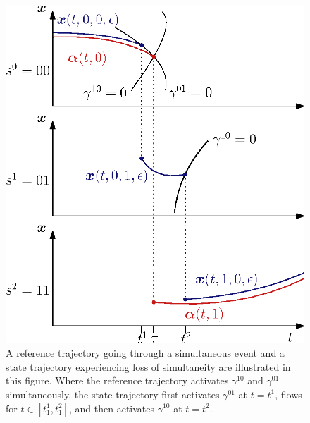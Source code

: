 \documentclass[../DC2017114Bouma.tex]{subfiles}
\begin{document}
\begin{figure}[h]
\centering
\includegraphics[width=.52\textwidth]{simulpert.eps}\caption{A reference trajectory going through a simultaneous event and a state trajectory experiencing loss of simultaneity are illustrated in this figure. Where the reference trajectory activates $\gamma^{10}$ and $\gamma^{01}$ simultaneously, the state trajectory first activates $\gamma^{01}$ at $t=t^1$, flows for $t\in [t^1_1,t^2_1]$, and then activates $\gamma^{10}$ at $t=t^2$.}\label{fig:4simulpert}
\end{figure}
\end{document}
